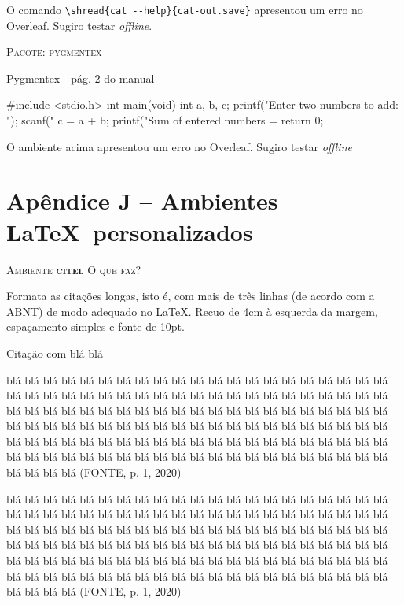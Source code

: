 O comando \verb|\shread{cat --help}{cat-out.save}| apresentou um erro no Overleaf. Sugiro testar \textit{offline}.

\textsc{Pacote: pygmentex}

\begin{codex}{Pygmentex - pág. 2 do manual}
    \begin{pygmented}[lang=c]
    #include <stdio.h>
    int main(void)
    {
    int a, b, c;
    printf("Enter two numbers to add: ");
    scanf("%
    c = a + b;
    printf("Sum of entered numbers = %
    return 0;
    }
    \end{pygmented}
\end{codex}

O ambiente acima apresentou um erro no Overleaf. Sugiro testar \textit{offline}


\chapter*{Apêndice J -- Ambientes \LaTeX\ personalizados}

\textsc{Ambiente \textbf{citel}}
\noindent\textsc{O que faz?}

Formata as citações longas, isto é, com mais de três linhas (de acordo com a ABNT) de modo adequado no \LaTeX. Recuo de 4cm à esquerda da margem, espaçamento simples e fonte de 10pt.

\begin{codex}{Citação com blá blá}
    \begin{citel}
    blá blá blá blá blá blá blá blá blá blá blá blá blá blá blá blá blá blá blá blá blá blá blá blá blá blá blá blá blá blá blá blá blá blá blá blá blá blá blá blá blá blá blá blá blá blá blá blá blá blá blá blá blá blá blá blá blá blá blá blá blá blá blá blá blá blá blá blá blá blá blá blá blá blá blá blá blá blá blá blá blá blá blá blá blá blá blá blá blá blá blá blá blá blá blá blá blá blá blá blá blá blá blá blá blá blá blá blá blá blá blá blá blá blá blá blá blá blá blá blá blá blá blá blá blá blá blá blá blá blá (FONTE, p. 1, 2020)
\end{citel}
\end{codex}

\begin{citel}
    blá blá blá blá blá blá blá blá blá blá blá blá blá blá blá blá blá blá blá blá blá blá blá blá blá blá blá blá blá blá blá blá blá blá blá blá blá blá blá blá blá blá blá blá blá blá blá blá blá blá blá blá blá blá blá blá blá blá blá blá blá blá blá blá blá blá blá blá blá blá blá blá blá blá blá blá blá blá blá blá blá blá blá blá blá blá blá blá blá blá blá blá blá blá blá blá blá blá blá blá blá blá blá blá blá blá blá blá blá blá blá blá blá blá blá blá blá blá blá blá blá blá blá blá blá blá blá blá blá blá (FONTE, p. 1, 2020)
\end{citel}


